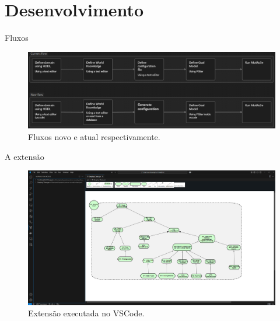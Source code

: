 \documentclass{beamer}
\begin{document}
\section{Desenvolvimento}
\begin{frame}{Fluxos}
  \begin{figure}[!h]
    \centering
    \includegraphics[width=1\textwidth]{VSCode extension flows.png} 
    \caption{Fluxos novo e atual respectivamente.}
  \end{figure}
\end{frame}
\begin{frame}{A extensão}
  \begin{figure}[!h]
    \centering
    \includegraphics[width=1\textwidth]{vscode print.png} 
    \caption{Extensão executada no VSCode.}
  \end{figure}
\end{frame}
\end{document}
